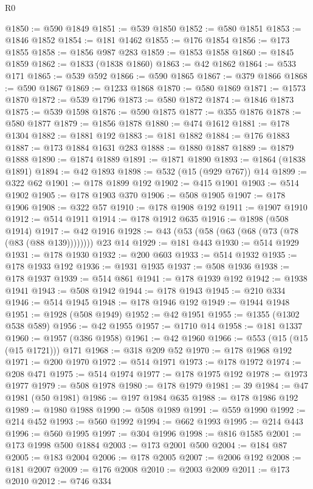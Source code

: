 \begin{lexlean}{R0}
\begin{coremodule}
@1850 := @590 @1849
@1851 := @539 @1850
@1852 := @580 @1851
@1853 := @1846 @1852
@1854 := @181 @1462
@1855 := @176 @1854
@1856 := @173 @1855
@1858 := @1856 @987 @283
@1859 := @1853 @1858
@1860 := @1845 @1859
@1862 := @1833 (@1838 @1860)
@1863 := @42 @1862
@1864 := @533 @171
@1865 := @539 @592
@1866 := @590 @1865
@1867 := @379 @1866
@1868 := @590 @1867
@1869 := @1233 @1868
@1870 := @580 @1869
@1871 := @1573 @1870
@1872 := @539 @1796
@1873 := @580 @1872
@1874 := @1846 @1873
@1875 := @539 @1598
@1876 := @590 @1875
@1877 := @355 @1876
@1878 := @580 @1877
@1879 := @1856 @1878
@1880 := @474 @1612
@1881 := @178 @1304
@1882 := @1881 @192
@1883 := @181 @1882
@1884 := @176 @1883
@1887 := @173 @1884 @1631 @283
@1888 := @1880 @1887
@1889 := @1879 @1888
@1890 := @1874 @1889
@1891 := @1871 @1890
@1893 := @1864 (@1838 @1891)
@1894 := @42 @1893
@1898 := @532 (@15 (@929 @767)) @14
@1899 := @322 @62
@1901 := @178 @1899 @192
@1902 := @415 @1901
@1903 := @514 @1902
@1905 := @178 @1903 @370
@1906 := @508 @1905
@1907 := @178 @1906
@1908 := @322 @57
@1910 := @178 @1908 @192
@1911 := @1907 @1910
@1912 := @514 @1911
@1914 := @178 @1912 @635
@1916 := @1898 (@508 @1914)
@1917 := @42 @1916
@1928 := @43 (@53 (@58 (@63 (@68 (@73 (@78 (@83 (@88 @139)))))))) @23 @14
@1929 := @181 @443
@1930 := @514 @1929
@1931 := @178 @1930
@1932 := @200 @603
@1933 := @514 @1932
@1935 := @178 @1933 @192
@1936 := @1931 @1935
@1937 := @508 @1936
@1938 := @178 @1937
@1939 := @514 @861
@1941 := @178 @1939 @192
@1942 := @1938 @1941
@1943 := @508 @1942
@1944 := @178 @1943
@1945 := @210 @334
@1946 := @514 @1945
@1948 := @178 @1946 @192
@1949 := @1944 @1948
@1951 := @1928 (@508 @1949)
@1952 := @42 @1951
@1955 := @1355 (@1302 @538 @589)
@1956 := @42 @1955
@1957 := @1710 @14
@1958 := @181 @1337
@1960 := @1957 (@386 @1958)
@1961 := @42 @1960
@1966 := @553 (@15 (@15 (@15 @1721))) @171
@1968 := @318 @209 @52
@1970 := @178 @1968 @192
@1971 := @200 @1970
@1972 := @514 @1971
@1973 := @178 @1972
@1974 := @208 @471
@1975 := @514 @1974
@1977 := @178 @1975 @192
@1978 := @1973 @1977
@1979 := @508 @1978
@1980 := @178 @1979
@1981 := 39
@1984 := @47 @1981 (@50 @1981)
@1986 := @197 @1984 @635
@1988 := @178 @1986 @192
@1989 := @1980 @1988
@1990 := @508 @1989
@1991 := @559 @1990
@1992 := @214 @452
@1993 := @560 @1992
@1994 := @662 @1993
@1995 := @214 @443
@1996 := @560 @1995
@1997 := @304 @1996
@1998 := @816 @1585
@2001 := @173 @1998 @500 @1884
@2003 := @173 @2001 @500
@2004 := @184 @87
@2005 := @183 @2004
@2006 := @178 @2005
@2007 := @2006 @192
@2008 := @181 @2007
@2009 := @176 @2008
@2010 := @2003 @2009
@2011 := @173 @2010
@2012 := @746 @334

\end{coremodule}
\end{lexlean}
